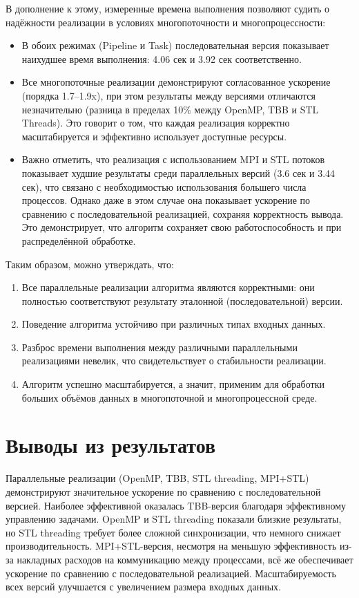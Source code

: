 \documentclass[a4paper,12pt]{article}
\begin{document}
В дополнение к этому, измеренные времена выполнения позволяют судить о надёжности реализации в условиях многопоточности и многопроцессности:
\begin{itemize}
    \item В обоих режимах (Pipeline и Task) последовательная версия показывает наихудшее время выполнения: 4.06 сек и 3.92 сек соответственно.
    \item Все многопоточные реализации демонстрируют согласованное ускорение (порядка 1.7–1.9x), при этом результаты между версиями отличаются незначительно (разница в пределах 10\% между OpenMP, TBB и STL Threads). Это говорит о том, что каждая реализация корректно масштабируется и эффективно использует доступные ресурсы.
    \item Важно отметить, что реализация с использованием MPI и STL потоков показывает худшие результаты среди параллельных версий (3.6 сек и 3.44 сек), что связано с необходимостью использования большего числа процессов. Однако даже в этом случае она показывает ускорение по сравнению с последовательной реализацией, сохраняя корректность вывода. Это демонстрирует, что алгоритм сохраняет свою работоспособность и при распределённой обработке.
\end{itemize}

Таким образом, можно утверждать, что:
\begin{enumerate}
    \item Все параллельные реализации алгоритма являются корректными: они полностью соответствуют результату эталонной (последовательной) версии.
    \item Поведение алгоритма устойчиво при различных типах входных данных.
    \item Разброс времени выполнения между различными параллельными реализациями невелик, что свидетельствует о стабильности реализации.
    \item Алгоритм успешно масштабируется, а значит, применим для обработки больших объёмов данных в многопоточной и многопроцессной среде.
\end{enumerate}

\section{Выводы из результатов}
\sloppy
Параллельные реализации (OpenMP, TBB, STL threading, MPI+STL) демонстрируют значительное ускорение по сравнению с последовательной версией. Наиболее эффективной оказалась TBB-версия благодаря эффективному управлению задачами. OpenMP и STL threading показали близкие результаты, но STL threading требует более сложной синхронизации, что немного снижает производительность. MPI+STL-версия, несмотря на меньшую эффективность из-за накладных расходов на коммуникацию между процессами, всё же обеспечивает ускорение по сравнению с последовательной реализацией. Масштабируемость всех версий улучшается с увеличением размера входных данных.
\fussy
\end{document}
